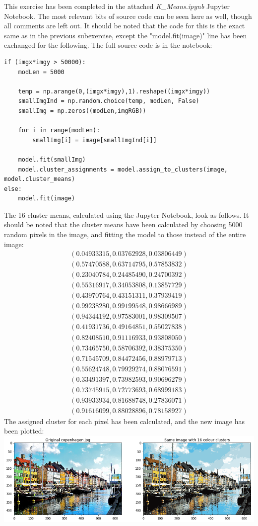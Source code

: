 This exercise has been completed in the attached \textit{K\_Means.ipynb} Jupyter Notebook. The most relevant bits of source code can be seen here as well, though all comments are left out. It should be noted that the code for this is the exact same as in the previous subexercise, except the "model.fit(image)" line has been exchanged for the following. The full source code is in the notebook:
\begin{verbatim}
if (imgx*imgy > 50000):
    modLen = 5000

    temp = np.arange(0,(imgx*imgy),1).reshape((imgx*imgy))
    smallImgInd = np.random.choice(temp, modLen, False)
    smallImg = np.zeros((modLen,imgRGB))
    
    for i in range(modLen):
        smallImg[i] = image[smallImgInd[i]]

    model.fit(smallImg)
    model.cluster_assignments = model.assign_to_clusters(image, model.cluster_means)
else:
    model.fit(image)
\end{verbatim}
The 16 cluster means, calculated using the Jupyter Notebook, look as follows. It should be noted that the cluster means have been calculated by choosing 5000 random pixels in the image, and fitting the model to those instead of the entire image:
$$
\begin{matrix}
(0.04933315, 0.03762928, 0.03806449) \\[3pt]
(0.57470588, 0.63714795, 0.57853832) \\[3pt]
(0.23040784, 0.24485490, 0.24700392) \\[3pt]
(0.55316917, 0.34053808, 0.13857729) \\[3pt]
(0.43970764, 0.43151311, 0.37939419) \\[3pt]
(0.99238280, 0.99199548, 0.98666989) \\[3pt]
(0.94344192, 0.97583001, 0.98309507) \\[3pt]
(0.41931736, 0.49164851, 0.55027838) \\[3pt]
(0.82408510, 0.91116933, 0.93808050) \\[3pt]
(0.73465750, 0.58706392, 0.38375350) \\[3pt]
(0.71545709, 0.84472456, 0.88979713) \\[3pt]
(0.55624748, 0.79929274, 0.88076591) \\[3pt]
(0.33491397, 0.73982593, 0.90696279) \\[3pt]
(0.73745915, 0.72773693, 0.68999183) \\[3pt]
(0.93933934, 0.81688748, 0.27836071) \\[3pt]
(0.91616099, 0.88028896, 0.78158927)
\end{matrix}
$$
The assigned cluster for each pixel has been calculated, and the new image has been plotted:\\
\includegraphics[width=\linewidth]{3c1.png}\\